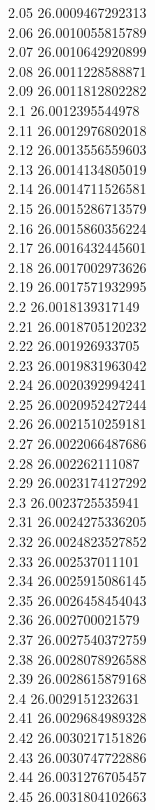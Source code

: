 {2.05	26.0009467292313\\
2.06	26.0010055815789\\
2.07	26.0010642920899\\
2.08	26.0011228588871\\
2.09	26.0011812802282\\
2.1	26.0012395544978\\
2.11	26.0012976802018\\
2.12	26.0013556559603\\
2.13	26.0014134805019\\
2.14	26.0014711526581\\
2.15	26.0015286713579\\
2.16	26.0015860356224\\
2.17	26.0016432445601\\
2.18	26.0017002973626\\
2.19	26.0017571932995\\
2.2	26.0018139317149\\
2.21	26.0018705120232\\
2.22	26.001926933705\\
2.23	26.0019831963042\\
2.24	26.0020392994241\\
2.25	26.0020952427244\\
2.26	26.0021510259181\\
2.27	26.0022066487686\\
2.28	26.002262111087\\
2.29	26.0023174127292\\
2.3	26.0023725535941\\
2.31	26.0024275336205\\
2.32	26.0024823527852\\
2.33	26.002537011101\\
2.34	26.0025915086145\\
2.35	26.0026458454043\\
2.36	26.002700021579\\
2.37	26.0027540372759\\
2.38	26.0028078926588\\
2.39	26.0028615879168\\
2.4	26.0029151232631\\
2.41	26.0029684989328\\
2.42	26.0030217151826\\
2.43	26.0030747722886\\
2.44	26.0031276705457\\
2.45	26.0031804102663\\
}
